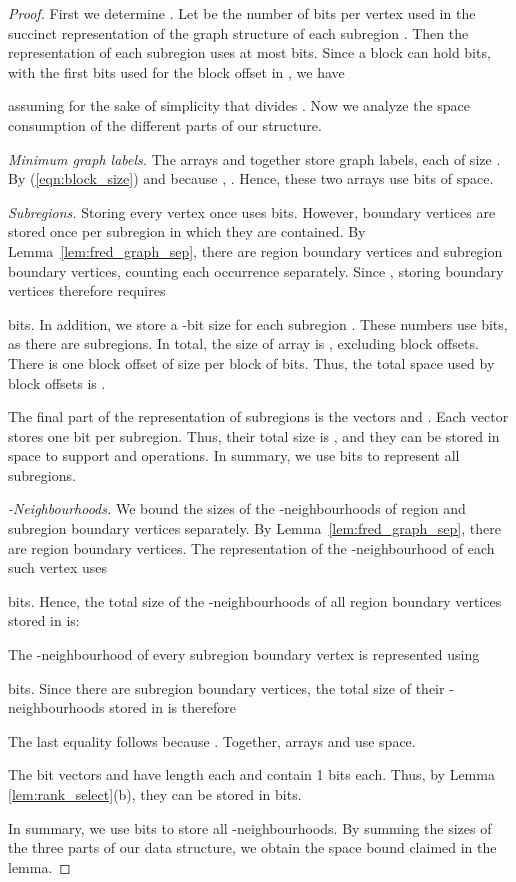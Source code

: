 \begin{proof}
  First we determine .
  Let  be the number of bits per vertex used in the succinct
  representation  of the graph structure of each subregion
  .
  Then the representation of each subregion uses at most 
   bits.
  Since a block can hold  bits, with the first  bits used
  for the block offset in , we have
  
  assuming for the sake of simplicity that  divides 
  .
  Now we analyze the space consumption of the different parts of our structure.

  \textit{Minimum graph labels.}  The arrays  and 
  together store  graph labels, each of size .
  By (\ref{eqn:block_size}) and because , 
  .
  Hence, these two arrays use  bits of space.

  \textit{Subregions.}  Storing every vertex once uses  bits.
  However, boundary vertices are stored once per subregion in which they are 
contained.
  By Lemma~\ref{lem:fred_graph_sep}, there are  region
  boundary vertices and  subregion boundary
  vertices, counting each occurrence separately.
  Since , storing boundary
  vertices therefore requires
  
  bits.
  In addition, we store a -bit size  for each
  subregion .
  These numbers use 
  bits, as there are  subregions.
  In total, the size of array  is ,
  excluding block offsets.
  There is one block offset of size  per block of  bits.
  Thus, the total space used by block offsets is .

  The final part of the representation of subregions is the vectors
   and .
  Each vector stores one bit per subregion.
  Thus, their total size is , and they can be stored
  in  space to support  and  operations.
  In summary, we use  bits to represent all
  subregions.

  \textit{-Neighbourhoods.}  We bound the sizes of the
  -neighbourhoods of region and subregion boundary vertices
  separately.
  By Lemma~\ref{lem:fred_graph_sep}, there are 
  region boundary vertices.
  The representation of the -neighbourhood of each such vertex uses
  
  bits.
  Hence, the total size of the -neighbourhoods of all
  region boundary vertices stored in  is:
  
  
  The -neighbourhood of every subregion boundary vertex is
  represented using
  
  bits.
  Since there are 
  subregion boundary vertices, the total size of their
  -neighbourhoods stored in  is therefore
  
  The last equality follows because .
  Together, arrays  and  use  space.

  The bit vectors  and  have length  each and
  contain  1 bits each.
  Thus, by Lemma \ref{lem:rank_select}(b), they
  can be stored in  bits.

  In summary, we use  bits to store all -neighbourhoods.
  By summing the sizes of the three parts of
  our data structure, we obtain the space bound claimed in the lemma.
\end{proof}

